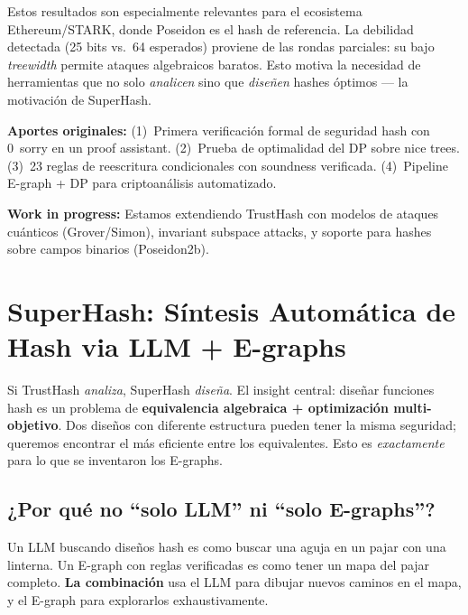 \documentclass[11pt,a4paper]{article}
\begin{document}
\noindent Estos resultados son especialmente relevantes para el ecosistema Ethereum/STARK, donde Poseidon es el hash de referencia. La debilidad detectada (25 bits vs.\ 64 esperados) proviene de las rondas parciales: su bajo \emph{treewidth} permite ataques algebraicos baratos. Esto motiva la necesidad de herramientas que no solo \emph{analicen} sino que \emph{diseñen} hashes óptimos --- la motivación de SuperHash.

\textbf{Aportes originales:} (1)~Primera verificación formal de seguridad hash con 0~sorry en un proof assistant. (2)~Prueba de optimalidad del DP sobre nice trees. (3)~23 reglas de reescritura condicionales con soundness verificada. (4)~Pipeline E-graph + DP para criptoanálisis automatizado.

\textbf{Work in progress:} Estamos extendiendo TrustHash con modelos de ataques cuánticos (Grover/Simon), invariant subspace attacks, y soporte para hashes sobre campos binarios (Poseidon2b).

\section{SuperHash: Síntesis Automática de Hash via LLM + E-graphs}

Si TrustHash \emph{analiza}, SuperHash \emph{diseña}. El insight central: diseñar funciones hash es un problema de \textbf{equivalencia algebraica + optimización multi-objetivo}. Dos diseños con diferente estructura pueden tener la misma seguridad; queremos encontrar el más eficiente entre los equivalentes. Esto es \emph{exactamente} para lo que se inventaron los E-graphs.

\subsection{¿Por qué no ``solo LLM'' ni ``solo E-graphs''?}

\begin{tcolorbox}[colback=eggblue!5, colframe=eggblue!60, title=\small El argumento central]
\small Un LLM buscando diseños hash es como buscar una aguja en un pajar con una linterna. Un E-graph con reglas verificadas es como tener un mapa del pajar completo. \textbf{La combinación} usa el LLM para dibujar nuevos caminos en el mapa, y el E-graph para explorarlos exhaustivamente.
\end{tcolorbox}
\end{document}

